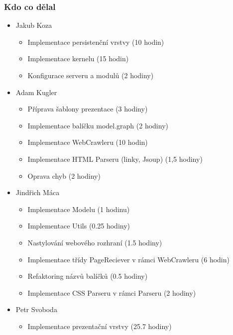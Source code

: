 \documentclass{beamer}
\begin{document}
\begin{frame}[allowframebreaks]\frametitle{Kdo co dělal} 
  \begin{itemize}
    \item Jakub Koza
      \begin{itemize}
       \item Implementace persistenční vrstvy (10 hodin)
       \item Implementace kernelu (15 hodin)
       \item Konfigurace serveru a modulů (2 hodiny)
     \end{itemize}    

    \item Adam Kugler
      \begin{itemize}
       \item Příprava šablony prezentace (3 hodiny)
       \item Implementace balíčku model.graph (2 hodiny)
       \item Implementace WebCrawleru (10 hodin)
       \item Implementace HTML Parseru (linky, Jsoup) (1,5 hodiny)
       \item Oprava chyb (2 hodiny)
     \end{itemize}

    \item Jindřich Máca
      \begin{itemize}
       \item Implementace Modelu (1 hodinu)
			 \item Implementace Utils (0.25 hodiny)
			 \item Nastylování webového rozhraní (1.5 hodiny)
			 \item Implementace třídy PageReciever v rámci WebCrawleru (6 hodin)
			 \item Refaktoring názvů balíčků (0.5 hodiny)
			 \item Implementace CSS Parseru v rámci Parseru (2 hodiny)
     \end{itemize}

    \item Petr Svoboda
      \begin{itemize}
      \item Implementace prezentační vrstvy (25.7 hodiny)
     \end{itemize}
   \end{itemize}  
\end{frame} 
\end{document}
